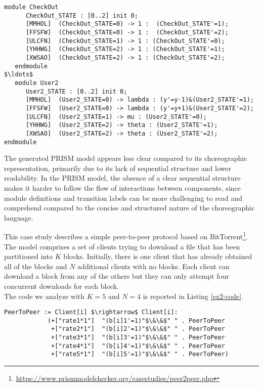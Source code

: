  \begin{lstlisting}[style=prism-color,caption={Generated PRISM program},captionpos=b,label={ex1-gen}]
   module CheckOut
      CheckOut_STATE : [0..2] init 0;
      [MMHOL]  (CheckOut_STATE=0) -> 1 :  (CheckOut_STATE'=1);
      [FFSFW]  (CheckOut_STATE=0) -> 1 :  (CheckOut_STATE'=2);
      [ULCFN]  (CheckOut_STATE=1) -> 1 : (CheckOut_STATE'=0);
      [YHHWG]  (CheckOut_STATE=2) -> 1 : (CheckOut_STATE'=1);
      [XWSAO]  (CheckOut_STATE=2) -> 1 : (CheckOut_STATE'=2);
   endmodule
$\ldots$
   module User2
      User2_STATE : [0..2] init 0;
      [MMHOL]  (User2_STATE=0) -> lambda : (y'=y-1)&(User2_STATE'=1);
      [FFSFW]  (User2_STATE=0) -> lambda : (y'=y+1)&(User2_STATE'=2);
      [ULCFN]  (User2_STATE=1) -> mu : (User2_STATE'=0);
      [YHHWG]  (User2_STATE=2) -> theta : (User2_STATE'=1);
      [XWSAO]  (User2_STATE=2) -> theta : (User2_STATE'=2);
endmodule
\end{lstlisting}
The generated PRISM model appears less clear compared to its
choreographic representation, primarily due to its lack of sequential
structure and lower readability.  In the PRISM model, the absence of a
clear sequential structure makes it harder to follow the flow of
interactions between components, 
since module definitions and transition labels can be more challenging
to read and comprehend compared to the concise and structured nature
of the choreographic language.



This case study describes a simple peer-to-peer protocol based on BitTorrent\footnote{\url{https://www.prismmodelchecker.org/casestudies/peer2peer.php}}. The model comprises a set of clients trying to download a file that has been partitioned into $K$ blocks. Initially, there is one client that has already obtained all of the blocks and $N$ additional clients with no blocks. Each client can download a block from any of the others but they can only attempt four concurrent downloads for each block.\\
The code we analyze with $K=5$ and $N=4$ is reported in Listing \ref{ex2-code}.
\begin{lstlisting}[style=chor-color,caption={Choreography for the Peer-To-Peer Protocol},captionpos=b,label={ex2-code}]
PeerToPeer := Client[i] $\rightarrow$ Client[i]: 
			(+["rate1*1"]  "(b[i]1'=1)"$\&\&$" " . PeerToPeer
			 +["rate2*1"]  "(b[i]2'=1)"$\&\&$" " . PeerToPeer
			 +["rate3*1"]  "(b[i]3'=1)"$\&\&$" " . PeerToPeer
			 +["rate4*1"]  "(b[i]4'=1)"$\&\&$" " . PeerToPeer
			 +["rate5*1"]  "(b[i]5'=1)"$\&\&$" " . PeerToPeer)
\end{lstlisting} 

